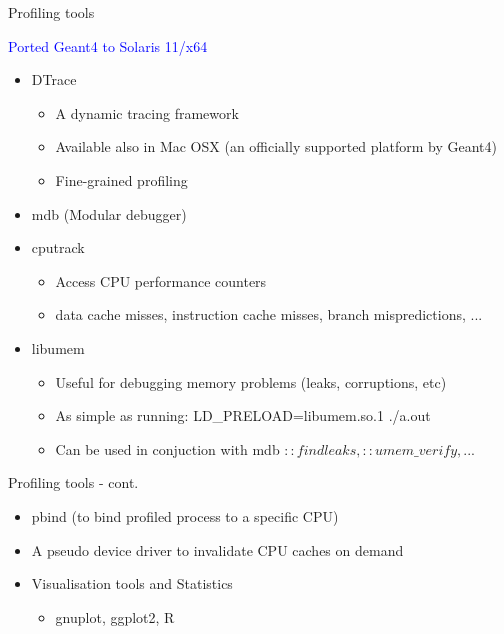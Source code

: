 \documentclass{beamer}
\begin{document}
\begin{frame}{Profiling tools}

\textcolor{blue}{Ported Geant4 to Solaris 11/x64}

\begin{itemize}
\item DTrace
\begin{itemize}
\item A dynamic tracing framework
\item Available also in Mac OSX (an officially supported platform by Geant4)
\item Fine-grained profiling
\end{itemize}
\item mdb (Modular debugger)
\item cputrack
\begin{itemize}
\item Access CPU performance counters
\item data cache misses, instruction cache misses, branch mispredictions, ...
\end{itemize}
\item libumem
\begin{itemize}
\item Useful for debugging memory problems (leaks, corruptions, etc)
\item As simple as running: LD\_PRELOAD=libumem.so.1 ./a.out
\item Can be used in conjuction with mdb \(::findleaks, ::umem\_verify, ...\)
\end{itemize}
\end{itemize}
\end{frame}

\begin{frame}{Profiling tools - cont.}
\begin{itemize}
\item pbind (to bind profiled process to a specific CPU)
\item A pseudo device driver to invalidate CPU caches on demand
\item Visualisation tools and Statistics
\begin{itemize}
\item gnuplot, ggplot2, R
\end{itemize}
\end{itemize}
\end{frame}
\end{document}
